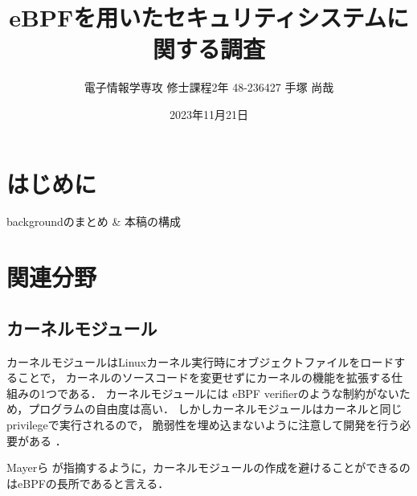 \documentclass[platex,a4j,10pt,twoside,twocolumn,dvipdfmx]{jsarticle}
\title{eBPFを用いたセキュリティシステムに関する調査 \\
\large{\textgt{A Survey on Security Systems with eBPF}}}
\author{電子情報学専攻 修士課程2年 48-236427 手塚 尚哉}
\date{2023年11月21日}
\begin{document}



\section{はじめに}
backgroundのまとめ \& 本稿の構成


    
\section{関連分野}
  \subsection{カーネルモジュール}
  カーネルモジュールはLinuxカーネル実行時にオブジェクトファイルをロードすることで，
  カーネルのソースコードを変更せずにカーネルの機能を拡張する仕組みの1つである．
  カーネルモジュールには eBPF verifierのような制約がないため，プログラムの自由度は高い．
  しかしカーネルモジュールはカーネルと同じprivilegeで実行されるので，
  脆弱性を埋め込まないように注意して開発を行う必要がある \cite{chen2011linux}．

  Mayerら \cite{mayer2021performance}が指摘するように，カーネルモジュールの作成を避けることができるのはeBPFの長所であると言える．
  
\end{document}
